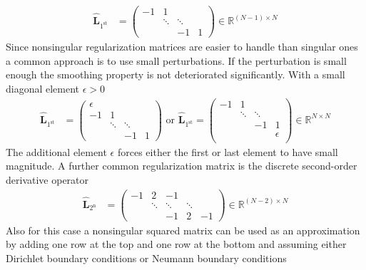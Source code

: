  \begin{align}\label{eq:first_derivative_penalty}
   \hat{\mathbf{L}}_\mathrm{1^{st}} &=
  \begin{pmatrix}
    -1    & 1      &        &  \\
          & \ddots & \ddots &  \\
          &        & -1     & 1
  \end{pmatrix} \in \mathbb{R}^{(N-1)\times N}
\end{align}
Since nonsingular regularization matrices are easier to handle than singular
ones a common approach is to use small perturbations.
If the perturbation is small enough the smoothing property is not deteriorated
significantly. With a small diagonal element $\epsilon > 0$
\begin{align}\label{eq:first_derivative_penalty_plus_epsilon}
   \hat{\mathbf{L}}_\mathrm{1^{st}} &=
  \begin{pmatrix}
  \epsilon & & & \\
    -1    & 1      &        &  \\
          & \ddots & \ddots &  \\
          &        & -1     & 1
  \end{pmatrix} \mbox{ or }  \hat{\mathbf{L}}_\mathrm{1^{st}}  =
  \begin{pmatrix}
    -1    & 1      &        &  \\
          & \ddots & \ddots &  \\
          &        & -1     & 1 \\
          & & & \epsilon \\
  \end{pmatrix} \in \mathbb{R}^{N\times N}
\end{align}
The additional element $\epsilon$ forces either the
first or last element to have small magnitude.
A further common regularization matrix is the discrete second-order derivative \cite{Donatelli2014}
operator
 \begin{align}\label{eq:second_derivative_penalty}
   \hat{\mathbf{L}}_\mathrm{2^{n}} &=
  \begin{pmatrix}
    -1    &  2     & -1     &        &  \\
          & \ddots & \ddots & \ddots &  \\
          &        & -1     & 2      & -1
  \end{pmatrix} \in \mathbb{R}^{(N-2)\times N}
\end{align}
Also for this case a nonsingular squared matrix can be used as an approximation by adding one row at the top and one row at the bottom and assuming either Dirichlet boundary conditions or Neumann boundary conditions
